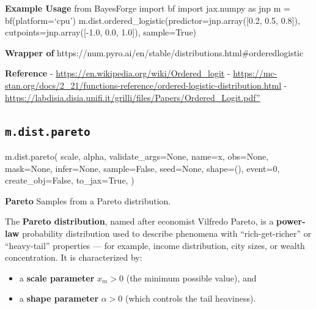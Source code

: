 \documentclass[
  letterpaper,
  DIV=11,
  numbers=noendperiod]{scrartcl}
\newenvironment{Shaded}{\begin{snugshade}}{\end{snugshade}}
\newcommand{\DecValTok}[1]{\textcolor[rgb]{0.68,0.00,0.00}{#1}}
\newcommand{\NormalTok}[1]{\textcolor[rgb]{0.00,0.23,0.31}{#1}}
\newcommand{\OperatorTok}[1]{\textcolor[rgb]{0.37,0.37,0.37}{#1}}
\newcommand{\StringTok}[1]{\textcolor[rgb]{0.13,0.47,0.30}{#1}}
\newcommand{\VariableTok}[1]{\textcolor[rgb]{0.07,0.07,0.07}{#1}}
\providecommand{\tightlist}{%
  \setlength{\itemsep}{0pt}\setlength{\parskip}{0pt}}\usepackage{longtable,booktabs,array}
\begin{document}
\textbf{Example Usage} from BayesForge import bf import jax.numpy as jnp
m = bf(platform=`cpu')
m.dist.ordered\_logistic(predictor=jnp.array({[}0.2, 0.5, 0.8{]}),
cutpoints=jnp.array({[}-1.0, 0.0, 1.0{]}), sample=True)

\textbf{Wrapper of}
https://num.pyro.ai/en/stable/distributions.html\#orderedlogistic

\textbf{Reference} - \url{https://en.wikipedia.org/wiki/Ordered_logit} -
\url{https://mc-stan.org/docs/2_21/functions-reference/ordered-logistic-distribution.html}
-
\href{https://labdisia.disia.unifi.it/grilli/files/Papers/Ordered_Logit.pdf\%22}{https://labdisia.disia.unifi.it/grilli/files/Papers/Ordered\_Logit.pdf''}

\subsection{\texorpdfstring{\texttt{m.dist.pareto}}{m.dist.pareto}}\label{pareto}

\begin{Shaded}
\begin{Highlighting}[]
\NormalTok{m.dist.pareto(}
\NormalTok{    scale,}
\NormalTok{    alpha,}
\NormalTok{    validate\_args}\OperatorTok{=}\VariableTok{None}\NormalTok{,}
\NormalTok{    name}\OperatorTok{=}\StringTok{\textquotesingle{}x\textquotesingle{}}\NormalTok{,}
\NormalTok{    obs}\OperatorTok{=}\VariableTok{None}\NormalTok{,}
\NormalTok{    mask}\OperatorTok{=}\VariableTok{None}\NormalTok{,}
\NormalTok{    infer}\OperatorTok{=}\VariableTok{None}\NormalTok{,}
\NormalTok{    sample}\OperatorTok{=}\VariableTok{False}\NormalTok{,}
\NormalTok{    seed}\OperatorTok{=}\VariableTok{None}\NormalTok{,}
\NormalTok{    shape}\OperatorTok{=}\NormalTok{(),}
\NormalTok{    event}\OperatorTok{=}\DecValTok{0}\NormalTok{,}
\NormalTok{    create\_obj}\OperatorTok{=}\VariableTok{False}\NormalTok{,}
\NormalTok{    to\_jax}\OperatorTok{=}\VariableTok{True}\NormalTok{,}
\NormalTok{)}
\end{Highlighting}
\end{Shaded}

\textbf{Pareto} Samples from a Pareto distribution.

The \textbf{Pareto distribution}, named after economist Vilfredo Pareto,
is a \textbf{power-law} probability distribution used to describe
phenomena with ``rich-get-richer'' or ``heavy-tail'' properties --- for
example, income distribution, city sizes, or wealth concentration. It is
characterized by:

\begin{itemize}
\tightlist
\item
  a \textbf{scale parameter} \(x_m > 0\) (the minimum possible value),
  and
\item
  a \textbf{shape parameter} \(\alpha > 0\) (which controls the tail
  heaviness).
\end{itemize}
\end{document}
